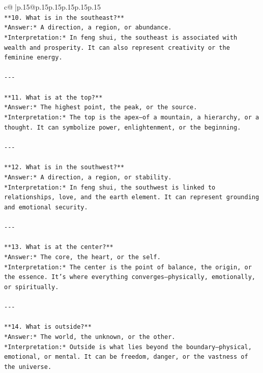 \documentclass{article}
\begin{document}
{\begin{supertabular}{c@{$\;$}|p{.15\linewidth}@{}p{.15\linewidth}p{.15\linewidth}p{.15\linewidth}p{.15\linewidth}p{.15\linewidth}}
{{{\\ 
\texttt{**10. What is in the southeast?**  } \\
\texttt{*Answer:* A direction, a region, or abundance.  } \\
\texttt{*Interpretation:* In feng shui, the southeast is associated with wealth and prosperity. It can also represent creativity or the feminine energy.} \\
\\ 
\texttt{{-}{-}{-}} \\
\\ 
\texttt{**11. What is at the top?**  } \\
\texttt{*Answer:* The highest point, the peak, or the source.  } \\
\texttt{*Interpretation:* The top is the apex—of a mountain, a hierarchy, or a thought. It can symbolize power, enlightenment, or the beginning.} \\
\\ 
\texttt{{-}{-}{-}} \\
\\ 
\texttt{**12. What is in the southwest?**  } \\
\texttt{*Answer:* A direction, a region, or stability.  } \\
\texttt{*Interpretation:* In feng shui, the southwest is linked to relationships, love, and the earth element. It can represent grounding and emotional security.} \\
\\ 
\texttt{{-}{-}{-}} \\
\\ 
\texttt{**13. What is at the center?**  } \\
\texttt{*Answer:* The core, the heart, or the self.  } \\
\texttt{*Interpretation:* The center is the point of balance, the origin, or the essence. It’s where everything converges—physically, emotionally, or spiritually.} \\
\\ 
\texttt{{-}{-}{-}} \\
\\ 
\texttt{**14. What is outside?**  } \\
\texttt{*Answer:* The world, the unknown, or the other.  } \\
\texttt{*Interpretation:* Outside is what lies beyond the boundary—physical, emotional, or mental. It can be freedom, danger, or the vastness of the universe.} \\
\\ 
}}}
\end{supertabular}}
\end{document}

